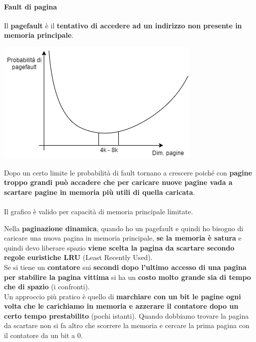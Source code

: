 \documentclass[10pt]{report}
\begin{document}
\paragraph{Fault di pagina} Il \textbf{pagefault} è il \textbf{tentativo di accedere ad un indirizzo non presente in memoria principale}.
\begin{multicols}{2}
\begin{center}
\includegraphics[scale=0.65]{pagefaultplot.png}
\end{center}
Dopo un certo limite le probabilità di fault tornano a crescere poiché con \textbf{pagine troppo grandi può accadere che per caricare nuove pagine vada a scartare pagine in memoria più utili di quella caricata}.\\\\
Il grafico è valido per capacità di memoria principale limitate.
\end{multicols}
Nella \textbf{paginazione dinamica}, quando ho un pagefault e quindi ho bisogno di caricare una nuova pagina in memoria principale, \textbf{se la memoria è satura} e quindi devo liberare spazio \textbf{viene scelta la pagina da scartare secondo regole euristiche LRU} (Least Recently Used).\\
Se si tiene un \textbf{contatore} sui \textbf{secondi dopo l'ultimo accesso di una pagina per stabilire la pagina vittima} si ha un \textbf{costo molto grande sia di tempo che di spazio} (i confronti).\\
Un approccio più pratico è quello di \textbf{marchiare con un bit le pagine ogni volta che le carichiamo in memoria e azzerare il contatore dopo un certo tempo prestabilito} (pochi istanti). Quando dobbiamo trovare la pagina da scartare non si fa altro che scorrere la memoria e cercare la prima pagina con il contatore da un bit a 0.
\pagebreak
\end{document}
